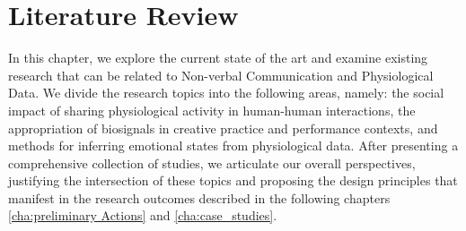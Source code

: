 

\chapter{Literature Review}
\label{cha:lit_review}

In this chapter, we explore the current state of the art and examine existing research that can be related to Non-verbal Communication and Physiological Data. We divide the research topics into the following areas, namely: the social impact of sharing physiological activity in human-human interactions, the appropriation of biosignals in creative practice and performance contexts, and methods for inferring emotional states from physiological data. After presenting a comprehensive collection of studies, we articulate our overall perspectives, justifying the intersection of these topics and proposing the design principles that manifest in the research outcomes described in the following chapters \ref{cha:preliminary Actions} and \ref{cha:case_studies}.

